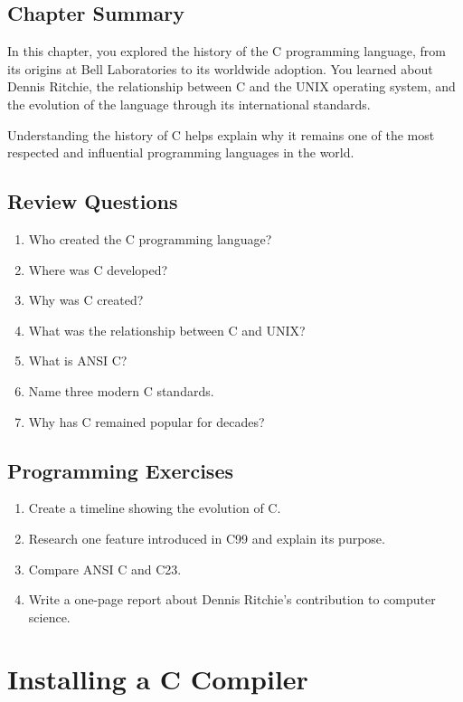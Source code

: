 \documentclass[12pt,openany]{book}
\begin{document}
\section{Chapter Summary}

In this chapter, you explored the history of the C programming language, from its origins at Bell Laboratories to its worldwide adoption. You learned about Dennis Ritchie, the relationship between C and the UNIX operating system, and the evolution of the language through its international standards.

Understanding the history of C helps explain why it remains one of the most respected and influential programming languages in the world.

\section{Review Questions}

\begin{enumerate}
    \item Who created the C programming language?
    \item Where was C developed?
    \item Why was C created?
    \item What was the relationship between C and UNIX?
    \item What is ANSI C?
    \item Name three modern C standards.
    \item Why has C remained popular for decades?
\end{enumerate}

\section{Programming Exercises}

\begin{enumerate}
    \item Create a timeline showing the evolution of C.
    \item Research one feature introduced in C99 and explain its purpose.
    \item Compare ANSI C and C23.
    \item Write a one-page report about Dennis Ritchie's contribution to computer science.
\end{enumerate}

\chapter{Installing a C Compiler}
\end{document}
